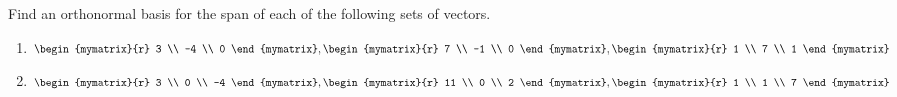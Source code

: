
\begin{ex} Find an orthonormal basis for the span of each of the following sets of
vectors.

\begin{enumerate}
\item $\begin{mymatrix}{r}
 3 \\
-4 \\
0
\end{mymatrix} ,\begin{mymatrix}{r}
 7 \\
-1 \\
0
\end{mymatrix} ,\begin{mymatrix}{r}
 1 \\
7 \\
1
\end{mymatrix} $

\item $\begin{mymatrix}{r}
3 \\
0 \\
-4
\end{mymatrix} ,\begin{mymatrix}{r}
 11 \\
0 \\
2
\end{mymatrix} ,\begin{mymatrix}{r}
1 \\
1 \\
7
\end{mymatrix} $


\end{enumerate}
\end{ex}
